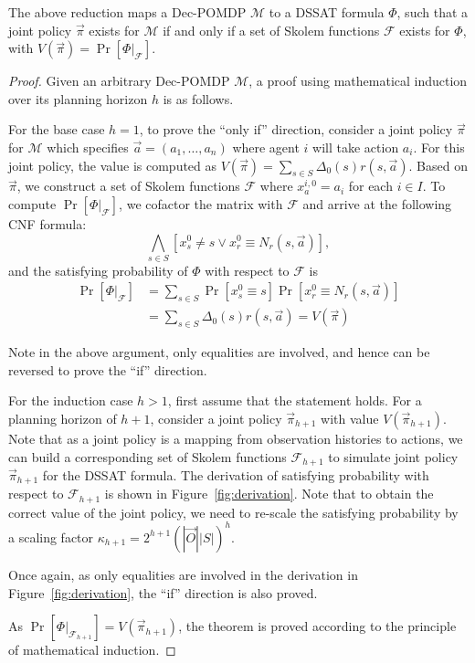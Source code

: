 \begin{theorem}\label{thm:reduction}
    The above reduction maps a Dec-POMDP $\mathcal{M}$ to a DSSAT formula $\Phi$, such that a joint policy $\vec{\pi}$ exists for $\mathcal{M}$ if and only if a set of Skolem functions $\mathcal{F}$ exists for $\Phi$, with $V(\vec{\pi})=\Pr[\Phi|_{\mathcal{F}}]$.
\end{theorem}
\begin{proof}
    Given an arbitrary Dec-POMDP $\mathcal{M}$, a proof using mathematical induction over its planning horizon $h$ is as follows.

    For the base case $h=1$, to prove the ``only if'' direction, consider a joint policy $\vec{\pi}$ for $\mathcal{M}$ which specifies $\vec{a}=(a_1,\ldots,a_n)$ where agent $i$ will take action $a_i$. For this joint policy, the value is computed as $V(\vec{\pi})=\sum_{s \in S}\Delta_0(s)r(s,\vec{a})$. Based on $\vec{\pi}$, we construct a set of Skolem functions $\mathcal{F}$ where $x_a^{i,0}=a_i$ for each $i\in I$. To compute $\Pr[\Phi|_{\mathcal{F}}]$, we cofactor the matrix with $\mathcal{F}$ and arrive at the following CNF formula:
    \[
        \bigwedge_{s\in S}[x_s^0\neq s \vee x_r^0 \equiv N_r(s,\vec{a})],
    \]
    and the satisfying probability of $\Phi$ with respect to $\mathcal{F}$ is
    \begin{align*}
        \Pr[\Phi|_{\mathcal{F}}] & =\sum_{s\in S}\Pr[x_s^0 \equiv s]\Pr[x_r^0 \equiv N_r(s,\vec{a})] \\
                                 & =\sum_{s\in S}\Delta_0(s)r(s,\vec{a})=V(\vec{\pi})
    \end{align*}

    Note in the above argument, only equalities are involved, and hence can be reversed to prove the ``if'' direction.

    For the induction case $h>1$, first assume that the statement holds. For a planning horizon of $h+1$, consider a joint policy $\vec{\pi}_{h+1}$ with value $V(\vec{\pi}_{h+1})$. Note that as a joint policy is a mapping from observation histories to actions, we can build a corresponding set of Skolem functions $\mathcal{F}_{h+1}$ to simulate joint policy $\vec{\pi}_{h+1}$ for the DSSAT formula. The derivation of satisfying probability with respect to $\mathcal{F}_{h+1}$ is shown in Figure~\ref{fig:derivation}. Note that to obtain the correct value of the joint policy, we need to re-scale the satisfying probability by a scaling factor $\kappa_{h+1}=2^{h+1}(|\vec{O}||S|)^{h}$.

    Once again, as only equalities are involved in the derivation in Figure~\ref{fig:derivation}, the ``if'' direction is also proved.

    As $\Pr[\Phi|_{\mathcal{F}_{h+1}}]=V(\vec{\pi}_{h+1})$, the theorem is proved according to the principle of mathematical induction.
\end{proof}

